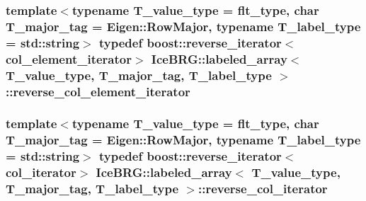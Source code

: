 \subsubsection[{reverse\+\_\+col\+\_\+element\+\_\+iterator}]{\setlength{\rightskip}{0pt plus 5cm}template$<$typename T\+\_\+value\+\_\+type = flt\+\_\+type, char T\+\_\+major\+\_\+tag = Eigen\+::\+Row\+Major, typename T\+\_\+label\+\_\+type = std\+::string$>$ typedef boost\+::reverse\+\_\+iterator$<${\bf col\+\_\+element\+\_\+iterator}$>$ {\bf Ice\+B\+R\+G\+::labeled\+\_\+array}$<$ T\+\_\+value\+\_\+type, T\+\_\+major\+\_\+tag, T\+\_\+label\+\_\+type $>$\+::{\bf reverse\+\_\+col\+\_\+element\+\_\+iterator}}\label{classIceBRG_1_1labeled__array_aacd98fdd793a8e3e937485151d8ecf27}
\hypertarget{classIceBRG_1_1labeled__array_a5837943c80f4cb557b41278ee0e339f4}{}
\subsubsection[{reverse\+\_\+col\+\_\+iterator}]{\setlength{\rightskip}{0pt plus 5cm}template$<$typename T\+\_\+value\+\_\+type = flt\+\_\+type, char T\+\_\+major\+\_\+tag = Eigen\+::\+Row\+Major, typename T\+\_\+label\+\_\+type = std\+::string$>$ typedef boost\+::reverse\+\_\+iterator$<${\bf col\+\_\+iterator}$>$ {\bf Ice\+B\+R\+G\+::labeled\+\_\+array}$<$ T\+\_\+value\+\_\+type, T\+\_\+major\+\_\+tag, T\+\_\+label\+\_\+type $>$\+::{\bf reverse\+\_\+col\+\_\+iterator}}\label{classIceBRG_1_1labeled__array_a5837943c80f4cb557b41278ee0e339f4}
\hypertarget{classIceBRG_1_1labeled__array_ae1a285122696e956d2bf21b147f94f9d}{}
